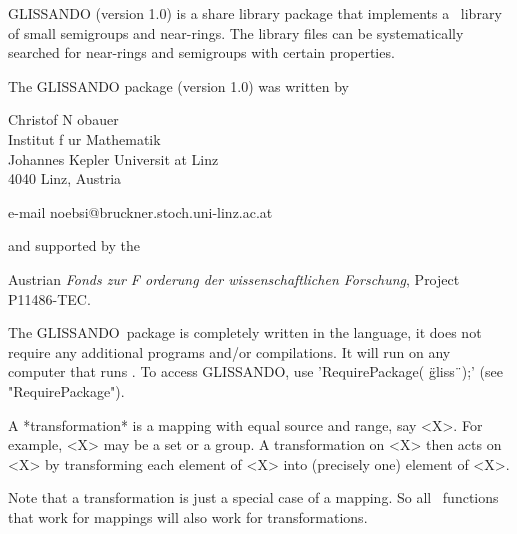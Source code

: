 
\newcommand{\GLISSANDO}{{\sf GLISSANDO}}

{\GLISSANDO} (version 1.0) is a share library package that implements a 
\GAP\ library of small semi\-groups and near-rings. 
The library files can be systematically searched for near-rings
and semigroups with certain properties.

The {\GLISSANDO} package (version 1.0) was written by

Christof N{ o}bauer\\
Institut f{ u}r Mathematik\\
Johannes Kepler Universit{ a}t Linz\\
4040 Linz, Austria

e-mail noebsi@bruckner.stoch.uni-linz.ac.at

and supported by the
 
Austrian {\it Fonds zur F{ o}rderung der wissenschaftlichen 
Forschung}, Project P11486-TEC.


The \GLISSANDO\ package is completely written in the {\GAP} language, 
it does not require any additional programs and/or compilations. It will 
run on any computer that runs {\GAP}. To access \GLISSANDO, use 
'RequirePackage( \"gliss\"\ );' (see "RequirePackage").

   
A *transformation* is a mapping with equal source and range, say <X>.
For example, <X> may be a set or a group. A transformation on <X> then acts
on <X> by transforming each element of <X> into (precisely one) 
element of <X>.

Note that a transformation is just a special case of a mapping. So all \GAP\  
functions that work for 
mappings will also work for transformations. 

